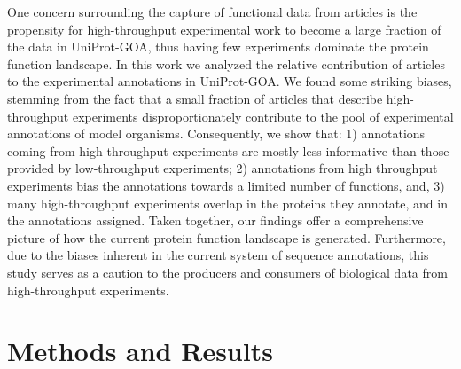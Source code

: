 \documentclass[12pt]{article}
\begin{document}
One concern surrounding the capture of functional data from articles is the propensity for
high-throughput experimental work to become a large fraction of the data in UniProt-GOA,
thus having few experiments dominate the protein function landscape. In this work we
analyzed the relative contribution of articles to the experimental annotations in UniProt-GOA.
We found some striking biases, stemming from the fact that a small fraction of articles that
describe high-throughput experiments disproportionately contribute to the pool of
experimental annotations of model organisms. Consequently, we show that: 1) annotations
coming from high-throughput experiments are mostly less informative than those provided by
low-throughput experiments;  2) annotations from high throughput experiments bias the
annotations towards a limited number of functions, and, 3) many high-throughput experiments
overlap in the proteins they annotate, and in the annotations assigned. Taken together, our
findings offer a comprehensive picture of how the current protein function landscape is
generated. Furthermore, due to the biases inherent in the current system of sequence
annotations, this study serves as a caution to the producers and consumers of biological data
from high-throughput experiments. 


\section*{Methods and Results}
\end{document}
